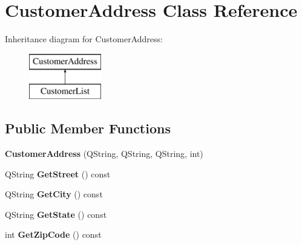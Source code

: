 \hypertarget{class_customer_address}{}\section{Customer\+Address Class Reference}
\label{class_customer_address}
Inheritance diagram for Customer\+Address\+:\begin{figure}[H]
\begin{center}
\leavevmode
\includegraphics[height=2.000000cm]{class_customer_address}
\end{center}
\end{figure}
\subsection*{Public Member Functions}
\begin{DoxyCompactItemize}
\item 
\mbox{\label{class_customer_address_a42b4b2cf860db0f31626f97bf55ca1a3}} 
{\bfseries Customer\+Address} (Q\+String, Q\+String, Q\+String, int)
\item 
\mbox{\label{class_customer_address_a75d3fb31489664f2f524df57dce4b987}} 
Q\+String {\bfseries Get\+Street} () const
\item 
\mbox{\label{class_customer_address_ac7ea47e415c0c51577fa2ae4f8780312}} 
Q\+String {\bfseries Get\+City} () const
\item 
\mbox{\label{class_customer_address_aef0f7c440785bc97abbf044c28336bce}} 
Q\+String {\bfseries Get\+State} () const
\item 
\mbox{\label{class_customer_address_ac745328627d7edc3363c7209ecc5f7fb}} 
int {\bfseries Get\+Zip\+Code} () const
\end{DoxyCompactItemize}
